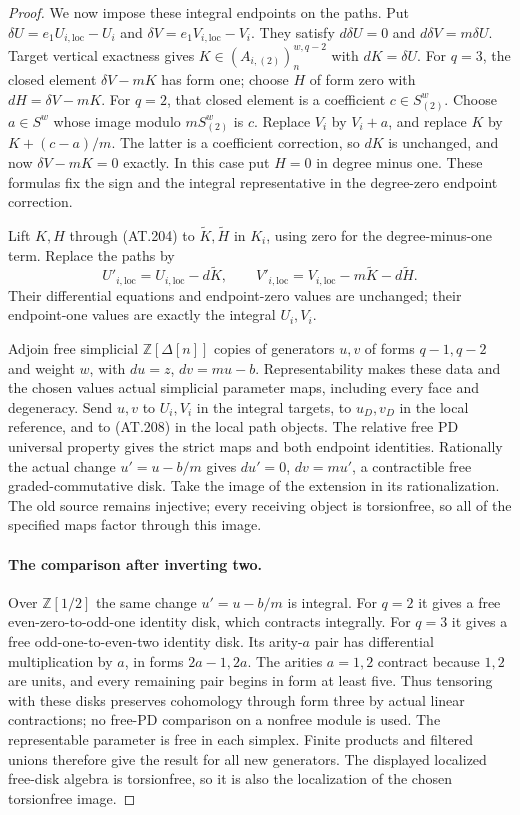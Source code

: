 \begin{proof}
We now impose these integral endpoints on the paths.
Put $\delta U=e_1U_{i,\mathrm{loc}}-U_i$ and
$\delta V=e_1V_{i,\mathrm{loc}}-V_i$.
They satisfy $d\delta U=0$ and $d\delta V=m\delta U$.
Target vertical exactness gives $K\in(A_{i,(2)})_n^{w,q-2}$
with $dK=\delta U$.
For $q=3$, the closed element $\delta V-mK$ has form one;
choose $H$ of form zero with $dH=\delta V-mK$.
For $q=2$, that closed element is a coefficient $c\in S_{(2)}^w$.
Choose $a\in S^w$ whose image modulo $mS_{(2)}^w$ is $c$.
Replace $V_i$ by $V_i+a$, and replace $K$ by $K+(c-a)/m$.
The latter is a coefficient correction, so $dK$ is unchanged,
and now $\delta V-mK=0$ exactly. In this case put $H=0$ in
degree minus one. These formulas fix the sign and the integral
representative in the degree-zero endpoint correction.

Lift $K,H$ through \textup{(AT.204)} to
$\widetilde K,\widetilde H$ in $K_i$, using zero for the
degree-minus-one term. Replace the paths by
\[
 U'_{i,\mathrm{loc}}=U_{i,\mathrm{loc}}-d\widetilde K,
 \qquad
 V'_{i,\mathrm{loc}}=V_{i,\mathrm{loc}}
                         -m\widetilde K-d\widetilde H.
 \tag{AT.208}
\]
Their differential equations and endpoint-zero values are unchanged;
their endpoint-one values are exactly the integral $U_i,V_i$.

Adjoin free simplicial $\mathbb Z[\Delta[n]]$ copies of generators
$u,v$ of forms $q-1,q-2$ and weight $w$, with $du=z$, $dv=mu-b$.
Representability makes these data and the chosen values actual
simplicial parameter maps, including every face and degeneracy.
Send $u,v$ to $U_i,V_i$ in the integral targets, to $u_D,v_D$
in the local reference, and to \textup{(AT.208)} in the local
path objects. The relative free PD universal property gives the
strict maps and both endpoint identities.
Rationally the actual change $u'=u-b/m$ gives $du'=0$, $dv=mu'$,
a contractible free graded-commutative disk.
Take the image of the extension in its rationalization.
The old source remains injective; every receiving object is
torsionfree, so all of the specified maps factor through this image.

\paragraph{The comparison after inverting two.}
Over $\mathbb Z[1/2]$ the same change $u'=u-b/m$ is integral.
For $q=2$ it gives a free even-zero-to-odd-one identity disk,
which contracts integrally. For $q=3$ it gives a free
odd-one-to-even-two identity disk. Its arity-$a$ pair has
differential multiplication by $a$, in forms $2a-1,2a$.
The arities $a=1,2$ contract because $1,2$ are units, and
every remaining pair begins in form at least five.
Thus tensoring with these disks preserves cohomology through
form three by actual linear contractions; no free-PD comparison
on a nonfree module is used. The representable parameter is free
in each simplex. Finite products and filtered unions therefore
give the result for all new generators.
The displayed localized free-disk algebra is torsionfree, so it
is also the localization of the chosen torsionfree image.


\end{proof}
